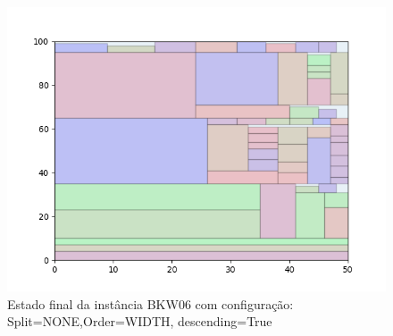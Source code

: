 \begin{figure}[H]
    \centering
    \caption[]{Estado final da instância BKW06 com configuração: Split=NONE,Order=WIDTH, descending=True}
    \label{fig:bkw06-none-width-true}
    \includegraphics[scale=0.5]{output/figures/bkw/bkw06/none/width/true/00}
\end{figure}